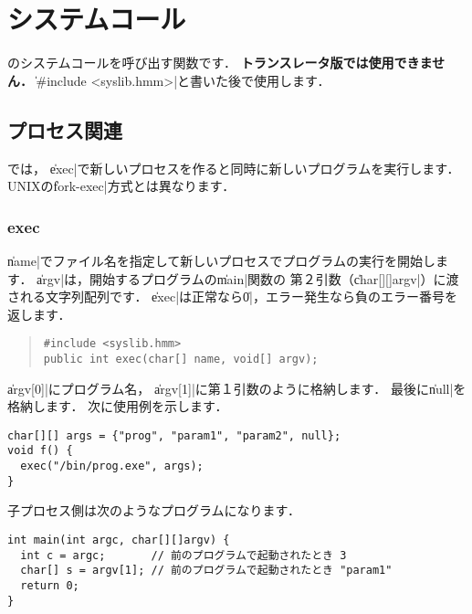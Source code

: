 % 
%
\chapter{システムコール}

\tacos のシステムコールを呼び出す関数です．
{\bf トランスレータ版では使用できません．}
\|#include <syslib.hmm>|と書いた後で使用します．

\section{プロセス関連}

\tacos では，
\|exec|で新しいプロセスを作ると同時に新しいプログラムを実行します．
UNIXの\|fork-exec|方式とは異なります．


\subsection{exec}

\|name|でファイル名を指定して新しいプロセスでプログラムの実行を開始します．
\|argv|は，開始するプログラムの\|main|関数の
第２引数（\|char[][]argv|）に渡される文字列配列です．
\|exec|は正常なら\|0|，エラー発生なら負のエラー番号を返します．

\begin{quote}
\begin{verbatim}
#include <syslib.hmm>
public int exec(char[] name, void[] argv);
\end{verbatim}
\end{quote}

\|argv[0]|にプログラム名，
\|argv[1]|に第１引数のように格納します．
最後に\|null|を格納します．
次に使用例を示します．

\begin{mylist}
\begin{verbatim}
char[][] args = {"prog", "param1", "param2", null};
void f() {
  exec("/bin/prog.exe", args);
}
\end{verbatim}
\end{mylist}

子プロセス側は次のようなプログラムになります．

\begin{mylist}
\begin{verbatim}
int main(int argc, char[][]argv) {
  int c = argc;       // 前のプログラムで起動されたとき 3
  char[] s = argv[1]; // 前のプログラムで起動されたとき "param1"
  return 0;
}
\end{verbatim}
\end{mylist}

